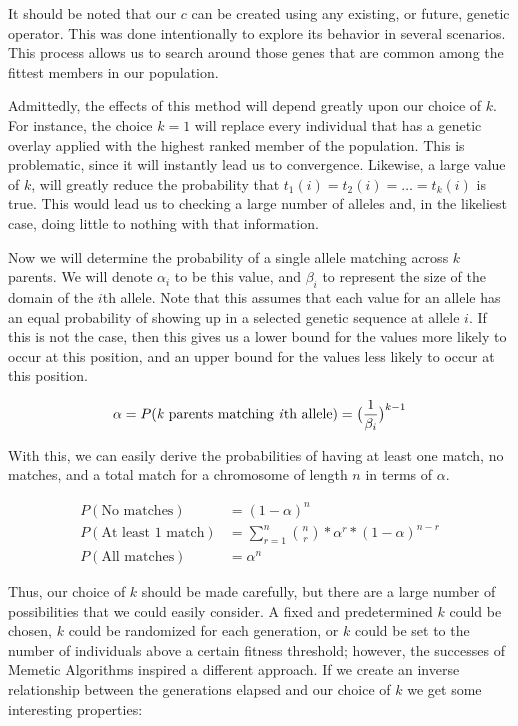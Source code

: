 It should be noted that our $c$ can be created using any existing, or future, genetic operator. This was done intentionally to explore its behavior in several scenarios. This process allows us to search around those genes that are common among the fittest members in our population. 

Admittedly, the effects of this method will depend greatly upon our choice of $k$. For instance, the choice $k = 1$ will replace every individual that has a genetic overlay applied with the highest ranked member of the population. This is problematic, since it will instantly lead us to convergence. Likewise, a large value of $k$, will greatly reduce the probability that $t_1(i) = t_2(i) = \ldots = t_k(i)$ is true. This would lead us to checking a large number of alleles and, in the likeliest case, doing little to nothing with that information.

Now we will determine the probability of a single allele matching across $k$ parents. We will denote $\alpha_i$ to be this value, and $\beta_i$ to represent the size of the domain of the $i$th allele. Note that this assumes that each value for an allele has an equal probability of showing up in a selected genetic sequence at allele $i$. If this is not the case, then this gives us a lower bound for the values more likely to occur at this position, and an upper bound for the values less likely to occur at this position.

\[ \alpha = P(\text{\emph{k} parents matching \emph{i}th allele}) = \big(\frac{1}{\beta_i}\big)^{k-1} \]

With this, we can easily derive the probabilities of having at least one match, no matches, and a total match for a chromosome of length $n$ in terms of $\alpha$.

\begin{align*}
P( \text{No matches})&= (1 - \alpha)^n \\
P( \text{At least 1 match}) &=\sum\limits^{n}_{r=1} \binom{n}{r}*\alpha^{r}*(1-\alpha)^{n-r} \\
P( \text{All matches})&= \alpha^n
\end{align*}

Thus, our choice of $k$ should be made carefully, but there are a large number of possibilities that we could easily consider. A fixed and predetermined $k$ could be chosen, $k$ could be randomized for each generation, or $k$ could be set to the number of individuals above a certain fitness threshold; however, the successes of Memetic Algorithms inspired a different approach. If we create an inverse relationship between the generations elapsed and our choice of $k$ we get some interesting properties:

